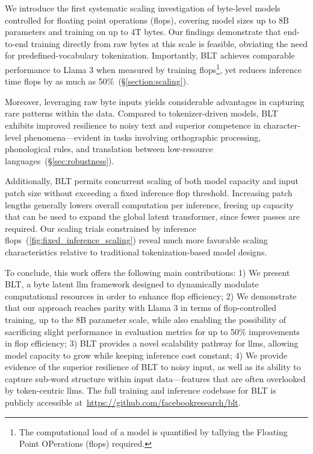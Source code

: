 We introduce the first systematic scaling investigation of byte-level models controlled for floating point operations (flops), covering model sizes up to 8B parameters and training on up to 4T bytes. Our findings demonstrate that end-to-end training directly from raw bytes at this scale is feasible, obviating the need for predefined-vocabulary tokenization. Importantly, {\textsc BLT} achieves comparable performance to Llama 3 when measured by training flops\footnote{The computational load of a model is quantified by tallying the Floating Point OPerations (flops) required.}, yet reduces inference time flops by as much as 50\%~(\S\ref{section:scaling}).

Moreover, leveraging raw byte inputs yields considerable advantages in capturing rare patterns within the data. Compared to tokenizer-driven models, {\textsc BLT} exhibits improved resilience to noisy text and superior competence in character-level phenomena—evident in tasks involving orthographic processing, phonological rules, and translation between low-resource languages~(\S\ref{sec:robustness}).

Additionally, {\textsc BLT} permits concurrent scaling of both model capacity and input patch size without exceeding a fixed inference flop threshold. Increasing patch lengths generally lowers overall computation per inference, freeing up capacity that can be used to expand the global latent transformer, since fewer passes are required. Our scaling trials constrained by inference flops~(\autoref{fig:fixed_inference_scaling}) reveal much more favorable scaling characteristics relative to traditional tokenization-based model designs.

To conclude, this work offers the following main contributions: 1) We present {\textsc BLT}, a byte latent llm framework designed to dynamically modulate computational resources in order to enhance flop efficiency; 2) We demonstrate that our approach reaches parity with Llama 3 in terms of flop-controlled training, up to the 8B parameter scale, while also enabling the possibility of sacrificing slight performance in evaluation metrics for up to 50\% improvements in flop efficiency; 3) {\textsc BLT} provides a novel scalability pathway for llms, allowing model capacity to grow while keeping inference cost constant; 4) We provide evidence of the superior resilience of {\textsc BLT} to noisy input, as well as its ability to capture sub-word structure within input data—features that are often overlooked by token-centric llms. The full training and inference codebase for {\textsc BLT} is publicly accessible at~\url{https://github.com/facebookresearch/blt}.

